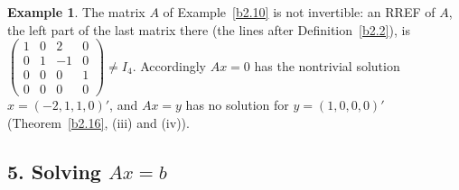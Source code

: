 \documentclass[12pt]{article}
\theoremstyle{definition}
\newtheorem{example}[theorem]{Example}
\begin{document}
\begin{example}\label{b2.22}
The matrix \(A\) of Example~\ref{b2.10} is not invertible: an RREF of \(A\), the left part of the last matrix there (the lines after Definition~\ref{b2.2}), is
\(\left(\begin{smallmatrix}1&0&2&0\\0&1&-1&0\\0&0&0&1\\0&0&0&0\end{smallmatrix}\right)\ne I_4\). Accordingly \(Ax=0\)
has the nontrivial solution \(x=(-2,1,1,0)'\), and \(Ax=y\) has no solution for \(y=(1,0,0,0)'\)
(Theorem~\ref{b2.16}, (iii) and (iv)).
\end{example}

\subsection*{5. Solving \(Ax=b\)}
\end{document}
